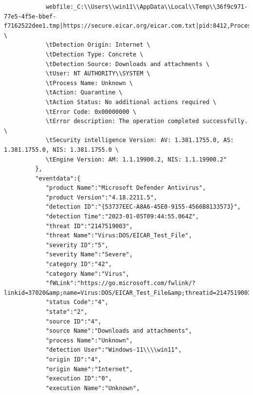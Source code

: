 \begin{itemize}
\begin{verbatim}
            webfile:_C:\\Users\\win11\\AppData\\Local\\Temp\\36f9c971-77e5-4f5e-bbef-f7162522dee1.tmp|https://secure.eicar.org/eicar.com.txt|pid:8412,ProcessStart:133173854939240064 \
            \tDetection Origin: Internet \
            \tDetection Type: Concrete \
            \tDetection Source: Downloads and attachments \
            \tUser: NT AUTHORITY\\SYSTEM \
            \tProcess Name: Unknown \
            \tAction: Quarantine \
            \tAction Status: No additional actions required \
            \tError Code: 0x00000000 \
            \tError description: The operation completed successfully. \
            \tSecurity intelligence Version: AV: 1.381.1755.0, AS: 1.381.1755.0, NIS: 1.381.1755.0 \
            \tEngine Version: AM: 1.1.19900.2, NIS: 1.1.19900.2"
         },
         "eventdata":{
            "product Name":"Microsoft Defender Antivirus",
            "product Version":"4.18.2211.5",
            "detection ID":"{53737EEC-A8A6-45E0-9155-4566B8133573}",
            "detection Time":"2023-01-05T09:44:55.064Z",
            "threat ID":"2147519003",
            "threat Name":"Virus:DOS/EICAR_Test_File",
            "severity ID":"5",
            "severity Name":"Severe",
            "category ID":"42",
            "category Name":"Virus",
            "fWLink":"https://go.microsoft.com/fwlink/?linkid=37020&amp;name=Virus:DOS/EICAR_Test_File&amp;threatid=2147519003&amp;enterprise=0",
            "status Code":"4",
            "state":"2",
            "source ID":"4",
            "source Name":"Downloads and attachments",
            "process Name":"Unknown",
            "detection User":"Windows-11\\\\win11",
            "origin ID":"4",
            "origin Name":"Internet",
            "execution ID":"0",
            "execution Name":"Unknown",

\end{verbatim}
\end{itemize}
